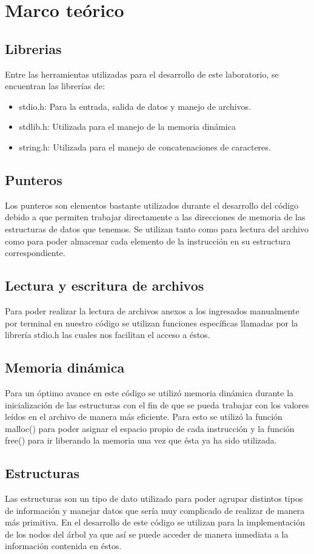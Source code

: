 \section{Marco teórico}

\subsection{Librerias}
\noindent Entre las herramientas utilizadas para el desarrollo de este laboratorio, se encuentran las librerías de:

\begin{itemize}
	\item stdio.h: Para la entrada, salida de datos y manejo de archivos.
    \item stdlib.h: Utilizada para el manejo de la memoria dinámica
	\item string.h: Utilizada para el manejo de concatenaciones de caracteres.
\end{itemize}

\subsection{Punteros}
\noindent Los punteros son elementos bastante utilizados durante el desarrollo del código debido a que permiten trabajar directamente a las direcciones de memoria de las estructuras de datos que tenemos. Se utilizan tanto como para lectura del archivo como para poder almacenar cada elemento de la instrucción en su estructura correspondiente.

\subsection{Lectura y escritura de archivos}
\noindent Para poder realizar la lectura de archivos anexos a los ingresados manualmente por terminal en nuestro código se utilizan funciones específicas llamadas por la librería stdio.h las cuales nos facilitan el acceso a éstos.

\subsection{Memoria dinámica}
\noindent Para un óptimo avance en este código se utilizó memoria dinámica durante la inicialización de las estructuras con el fin de que se pueda trabajar con los valores leídos en el archivo de manera más eficiente. Para esto se utilizó la función malloc() para poder asignar el espacio propio de cada instrucción y la función free() para ir liberando la memoria una vez que ésta ya ha sido utilizada.

\subsection{Estructuras}
\noindent Las estructuras son un tipo de dato utilizado para poder agrupar distintos tipos de información y manejar datos que sería muy complicado de realizar de manera más primitiva. En el desarrollo de este código se utilizan para la implementación de los nodos del árbol ya que así se puede acceder de manera inmediata a la información contenida en éstos.
